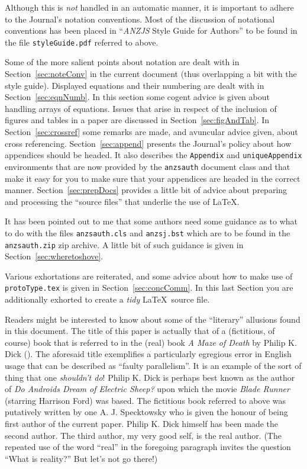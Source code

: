 \documentclass[times, doublespace]{anzsauth}
\begin{document}
Although this is \emph{not} handled in an automatic manner,
it is important to adhere to the Journal's notation conventions.
Most of the discussion of notational conventions has been placed in
``{\textit{ANZJS} Style Guide for Authors}'' to be found in the
file \texttt{styleGuide.pdf} referred to above.

Some of the more salient points about notation are dealt with
in Section~\ref{sec:noteConv} in the current document (thus
overlapping a bit with the style guide).  Displayed equations
and their numbering are dealt with in Section~\ref{sec:eqnNumb}.
In this section some cogent advice is given about handling arrays of
equations.  Issues that arise in respect of the inclusion of figures
and tables in a paper are discussed in Section~\ref{sec:figAndTab}.
In Section~\ref{sec:crossref} some remarks are made, and avuncular
advice given, about cross referencing.  Section~\ref{sec:append}
presents the Journal's policy about how appendices should be headed.
It also describes the \texttt{Appendix} and \texttt{uniqueAppendix}
environments that are now provided by the \texttt{anzsauth} document
class and that make it easy for you to make sure that your appendices
are headed in the correct manner.  Section~\ref{sec:prepDocs}
provides a little bit of advice about preparing and processing the
``source files'' that underlie the use of \LaTeX.

It has been pointed out to me that some authors need some
guidance as to what to do with the files \texttt{anzsauth.cls} and
\texttt{anzsj.bst} which are to be found in the \texttt{anzsauth.zip}
zip archive.  A little bit of such guidance is given in
Section~\ref{sec:wheretoshove}.

Various exhortations are reiterated, and some advice about
how to make use of \texttt{protoType.tex} is given in
Section~\ref{sec:concComm}.  In this last Section you are
additionally exhorted to create a \emph{tidy} \LaTeX\ source file.

Readers might be interested to know about some of the ``literary''
allusions found in this document.  The title of this paper
is actually that of a (fictitious, of course) book that is
referred to in the (real) book \textit{A Maze of Death} by Philip
K. Dick (\citeyear{Dick1971}).  The aforesaid title exemplifies a
particularly egregious error in English usage that can be described
as ``faulty parallelism''.  It is an example of the sort of thing
that one \emph{shouldn't do}!  Philip K. Dick is perhaps best
known as the author of \textit{Do Androids Dream of Electric Sheep?}
\citep{Dick1968} upon which the movie \textit{Blade Runner} (starring
Harrison Ford) was based.  The fictitious book referred to above was
putatively written by one A. J. Specktowsky who is given the honour
of being first author of the current paper.  Philip K. Dick himself
has been made the second author.  The third author, my very good
self, is the real author.  (The repeated use of the word ``real''
in the foregoing paragraph invites the question ``What is reality?''
But let's not go there!)
\end{document}
